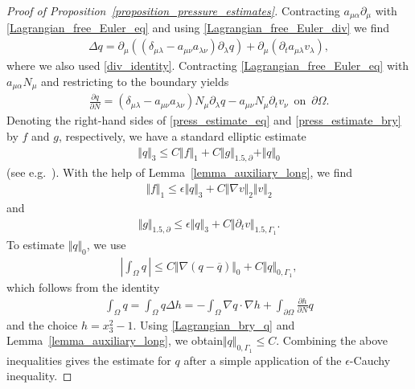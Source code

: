 \documentclass[10pt,reqno]{amsart}
\theoremstyle{plain}
\theoremstyle{definition}
\numberwithin{equation}{section}
\newcommand{\al}{\alpha}
\newcommand{\Ga}{\Gamma}
\newcommand{\de}{\delta}
\newcommand{\la}{\lambda}
\newcommand{\Om}{\Omega}
\newcommand{\norm}[1]{\Vert#1\Vert}
\def\fractext#1#2{{#1}/{#2}}
\def\referee#1{{\color{green}\hbox{\bf ~#1~}}} %
\begin{document}
\begin{proof}[Proof of Proposition~\ref{proposition_pressure_estimates}]
Contracting $a_{\mu \al}\partial_\mu$ with \eqref{Lagrangian_free_Euler_eq} and using \eqref{Lagrangian_free_Euler_div} we find
\begin{gather}
\Delta q = \partial_\mu( (\de_{\mu\la} - a_{\mu\nu} a_{\la \nu} ) \partial_\la q ) + \partial_\mu ( \partial_t a_{\mu\la} v_\la ),
\label{press_estimate_eq}
\end{gather}
where we also used \eqref{div_identity}.
Contracting \eqref{Lagrangian_free_Euler_eq} with $a_{\mu \al} N_\mu$ and restricting to the boundary yields
\begin{gather}
\frac{\partial q}{\partial N} = ( \de_{\mu \la} - a_{\mu\nu} a_{\la \nu} )N_\mu \partial_\la q - a_{\mu \nu} N_\mu \partial_t v_\nu
\, \text{ on } \, \partial \Om.
\label{press_estimate_bry}
\end{gather}
Denoting the right-hand sides of \eqref{press_estimate_eq} and \eqref{press_estimate_bry} by $f$ and $g$, respectively,
we have a standard elliptic
estimate 
\begin{gather}
\norm{q}_3 \leq C \norm{f}_1 + C \norm{g}_{1.5,\partial} + \norm{q}_0
\nonumber
\end{gather}
(see e.g.~\cite[Theorem~3.6]{ShkollerElliptic}).
With the help of Lemma~\ref{lemma_auxiliary_long}, we find
\begin{gather}
\norm{f}_1 \leq \epsilon \norm{q}_3 + C \norm{\nabla v}_2 \norm{v}_2
\nonumber
\end{gather}
and 
\begin{gather}
\norm{g}_{1.5,\partial} \leq \epsilon \norm{q}_3 + C \norm{\partial_t v}_{1.5,\Ga_1}
   .
\nonumber
\end{gather}
To estimate $\norm{q}_0$, we use 
\begin{gather}
\left| \int_\Om q \,  \right| \leq C \norm{ \nabla(q - \overline{q} ) }_0 + C \norm{q}_{0,\Ga_1},
\nonumber
\end{gather}
which follows from the identity
\begin{gather}
\int_\Om q
   = \int_\Om q \Delta h
   = - \int_\Om \nabla q \cdot \nabla h + \int_{\partial \Om} \frac{\partial h}{\partial N} q
\nonumber
\end{gather}
and the choice
$h=x_3^2-1$.
Using \eqref{Lagrangian_bry_q}
and Lemma~\ref{lemma_auxiliary_long}, we obtain$\norm{q}_{0,\Ga_1} \leq C$. Combining the above inequalities
gives the estimate for $q$ after a simple application of the $\epsilon$-Cauchy inequality.


\end{proof}
\end{document}
